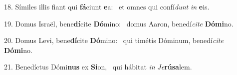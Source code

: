 18. Símiles illis fiant qui \textbf{fá}ciunt \textbf{e}a: \ast\  et omnes qui confí\textit{dunt} \textit{in} \textbf{e}is.\

19. Domus Israël, bene\textbf{dí}cite \textbf{Dó}mino: \ast\  domus Aaron, benedí\textit{ci}\textit{te} \textbf{Dó}\textbf{mi}no.\

20. Domus Levi, bene\textbf{dí}cite \textbf{Dó}mino: \ast\  qui timétis Dóminum, benedí\textit{ci}\textit{te} \textbf{Dó}\textbf{mi}no.\

21. Benedíctus Dómi\textbf{nus} ex \textbf{Si}on, \ast\  qui hábitat \textit{in} \textit{Je}\textbf{rú}\textbf{sa}lem.\

